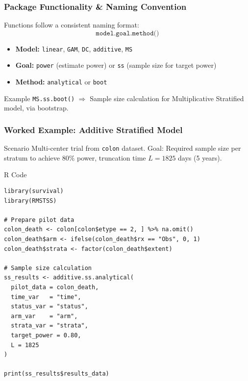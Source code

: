\documentclass{beamer}
\begin{document}
\begin{frame}
\frametitle{Package Functionality \& Naming Convention}

Functions follow a consistent naming format:
\[
\texttt{model.goal.method()}
\]

\begin{itemize}
  \item \textbf{Model:} \texttt{linear}, \texttt{GAM}, \texttt{DC}, \texttt{additive}, \texttt{MS}
  \item \textbf{Goal:} \texttt{power} (estimate power) or \texttt{ss} (sample size for target power)
  \item \textbf{Method:} \texttt{analytical} or \texttt{boot}
\end{itemize}

\begin{block}{Example}
\texttt{MS.ss.boot()}  
$\Rightarrow$ Sample size calculation for Multiplicative Stratified model, via bootstrap.
\end{block}

\end{frame}

\begin{frame}[fragile]
\frametitle{Worked Example: Additive Stratified Model}

\begin{block}{Scenario}
Multi-center trial from \texttt{colon} dataset.  
Goal: Required sample size per stratum to achieve $80\%$ power, truncation time $L = 1825$ days (5 years).
\end{block}

\begin{block}{R Code}
\scriptsize
\begin{verbatim}
library(survival)
library(RMSTSS)

# Prepare pilot data
colon_death <- colon[colon$etype == 2, ] %>% na.omit()
colon_death$arm <- ifelse(colon_death$rx == "Obs", 0, 1)
colon_death$strata <- factor(colon_death$extent)

# Sample size calculation
ss_results <- additive.ss.analytical(
  pilot_data = colon_death,
  time_var   = "time",
  status_var = "status",
  arm_var    = "arm",
  strata_var = "strata",
  target_power = 0.80,
  L = 1825
)

print(ss_results$results_data)
\end{verbatim}
\end{block}

\end{frame}
\end{document}

